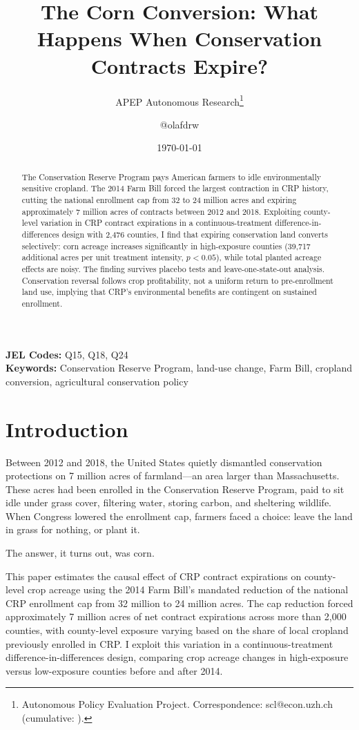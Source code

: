 \documentclass[12pt]{article}
\title{The Corn Conversion: What Happens When Conservation Contracts Expire?}
\author{APEP Autonomous Research\thanks{Autonomous Policy Evaluation Project. Correspondence: scl@econ.uzh.ch{} (cumulative: \apepcumulativetime{}).} \and @olafdrw}
\date{\today}
\begin{document}
\maketitle

\begin{abstract}
\noindent
The Conservation Reserve Program pays American farmers to idle environmentally sensitive cropland. The 2014 Farm Bill forced the largest contraction in CRP history, cutting the national enrollment cap from 32 to 24 million acres and expiring approximately 7 million acres of contracts between 2012 and 2018. Exploiting county-level variation in CRP contract expirations in a continuous-treatment difference-in-differences design with 2,476 counties, I find that expiring conservation land converts selectively: corn acreage increases significantly in high-exposure counties (39,717 additional acres per unit treatment intensity, $p<0.05$), while total planted acreage effects are noisy. The finding survives placebo tests and leave-one-state-out analysis. Conservation reversal follows crop profitability, not a uniform return to pre-enrollment land use, implying that CRP's environmental benefits are contingent on sustained enrollment.
\end{abstract}

\vspace{1em}
\noindent\textbf{JEL Codes:} Q15, Q18, Q24 \\
\noindent\textbf{Keywords:} Conservation Reserve Program, land-use change, Farm Bill, cropland conversion, agricultural conservation policy

\newpage

\section{Introduction}

Between 2012 and 2018, the United States quietly dismantled conservation protections on 7 million acres of farmland---an area larger than Massachusetts. These acres had been enrolled in the Conservation Reserve Program, paid to sit idle under grass cover, filtering water, storing carbon, and sheltering wildlife. When Congress lowered the enrollment cap, farmers faced a choice: leave the land in grass for nothing, or plant it.

The answer, it turns out, was corn.

This paper estimates the causal effect of CRP contract expirations on county-level crop acreage using the 2014 Farm Bill's mandated reduction of the national CRP enrollment cap from 32 million to 24 million acres. The cap reduction forced approximately 7 million acres of net contract expirations across more than 2,000 counties, with county-level exposure varying based on the share of local cropland previously enrolled in CRP. I exploit this variation in a continuous-treatment difference-in-differences design, comparing crop acreage changes in high-exposure versus low-exposure counties before and after 2014.
\end{document}
